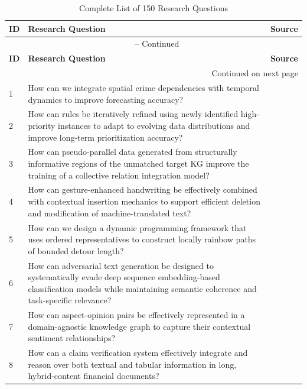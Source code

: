 \begin{longtable}{p{0.8cm}p{9cm}p{2.5cm}}
\caption{Complete List of 150 Research Questions} \\
\toprule
\textbf{ID} & \textbf{Research Question} & \textbf{Source} \\
\midrule
\endfirsthead
\multicolumn{3}{c}{\tablename\ \thetable{} -- Continued} \\
\toprule
\textbf{ID} & \textbf{Research Question} & \textbf{Source} \\
\midrule
\endhead
\midrule
\multicolumn{3}{r}{Continued on next page} \\
\endfoot
\bottomrule
\endlastfoot

1 & How can we integrate spatial crime dependencies with temporal dynamics to improve forecasting accuracy? & \cite{10.1609/aaai.v36i4.20338} \\
2 & How can rules be iteratively refined using newly identified high-priority instances to adapt to evolving data distributions and improve long-term prioritization accuracy? & \cite{10.1609/aaai.v33i01.33019440} \\
3 & How can pseudo-parallel data generated from structurally informative regions of the unmatched target KG improve the training of a collective relation integration model? & \cite{10.18653/v1/2021.acl-long.363} \\
4 & How can gesture-enhanced handwriting be effectively combined with contextual insertion mechanics to support efficient deletion and modification of machine-translated text? & \cite{10.18653/v1/2020.acl-main.155} \\
5 & How can we design a dynamic programming framework that uses ordered representatives to construct locally rainbow paths of bounded detour length? & \cite{10.1609/aaai.v38i8.28639} \\
6 & How can adversarial text generation be designed to systematically evade deep sequence embedding-based classification models while maintaining semantic coherence and task-specific relevance? & \cite{10.1609/aaai.v37i13.26811} \\
7 & How can aspect-opinion pairs be effectively represented in a domain-agnostic knowledge graph to capture their contextual sentiment relationships? & \cite{10.1609/aaai.v36i11.21653} \\
8 & How can a claim verification system effectively integrate and reason over both textual and tabular information in long, hybrid-content financial documents? & \cite{10.18653/v1/2024.emnlp-main.818} \\

\end{longtable}
